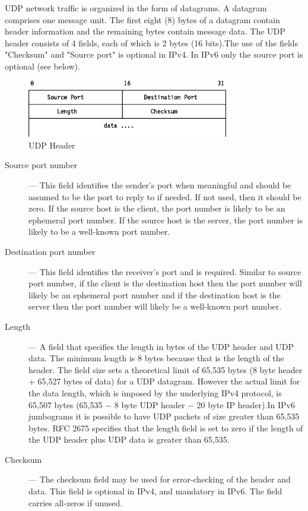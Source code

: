 \documentclass[12pt]{article}
\theoremstyle{definition}
\begin{document}
			UDP network traffic is organized in the form of datagrams. A datagram comprises one message unit. The first eight (8) bytes of a datagram contain header information and the remaining bytes contain message data.
			The UDP header consists of 4 fields, each of which is 2 bytes (16 bits).The use of the fields "Checksum" and "Source port" is optional in IPv4. In IPv6 only the source port is optional (see below).
			
			\begin{figure}[!h]
				\centering
				\includegraphics[width=250pt]{pictures/udp_header.png}
				\caption{UDP Header\cite{AlEroud2017}}
				\label{fig:udp-header}
			\end{figure}
		
			\begin{description}
				\item [Source port number] ---
				This field identifies the sender's port when meaningful and should be assumed to be the port to reply to if needed. If not used, then it should be zero. If the source host is the client, the port number is likely to be an ephemeral port number. If the source host is the server, the port number is likely to be a well-known port number.
				
				\item [Destination port number] ---
				This field identifies the receiver's port and is required. Similar to source port number, if the client is the destination host then the port number will likely be an ephemeral port number and if the destination host is the server then the port number will likely be a well-known port number.
				
				\item [Length] ---
				A field that specifies the length in bytes of the UDP header and UDP data. The minimum length is 8 bytes because that is the length of the header. The field size sets a theoretical limit of 65,535 bytes (8 byte header + 65,527 bytes of data) for a UDP datagram. However the actual limit for the data length, which is imposed by the underlying IPv4 protocol, is 65,507 bytes (65,535 − 8 byte UDP header − 20 byte IP header).In IPv6 jumbograms it is possible to have UDP packets of size greater than 65,535 bytes. RFC 2675 specifies that the length field is set to zero if the length of the UDP header plus UDP data is greater than 65,535.
				
				\item[Checksum] ---
				The checksum field may be used for error-checking of the header and data. This field is optional in IPv4, and mandatory in IPv6. The field carries all-zeros if unused.
			\end{description}
		
\end{document}
